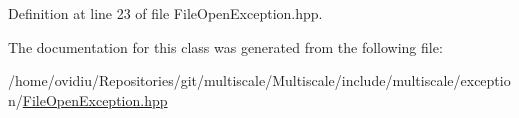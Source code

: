 Definition at line 23 of file File\-Open\-Exception.\-hpp.



The documentation for this class was generated from the following file\-:\begin{DoxyCompactItemize}
\item 
/home/ovidiu/\-Repositories/git/multiscale/\-Multiscale/include/multiscale/exception/\hyperlink{FileOpenException_8hpp}{File\-Open\-Exception.\-hpp}\end{DoxyCompactItemize}
